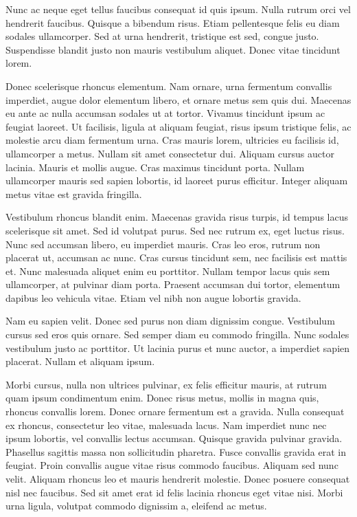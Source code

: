 Nunc ac neque eget tellus faucibus consequat id quis ipsum. Nulla rutrum orci vel hendrerit faucibus. Quisque a bibendum risus. Etiam pellentesque felis eu diam sodales ullamcorper. Sed at urna hendrerit, tristique est sed, congue justo. Suspendisse blandit justo non mauris vestibulum aliquet. Donec vitae tincidunt lorem.

Donec scelerisque rhoncus elementum. Nam ornare, urna fermentum convallis imperdiet, augue dolor elementum libero, et ornare metus sem quis dui. Maecenas eu ante ac nulla accumsan sodales ut at tortor. Vivamus tincidunt ipsum ac feugiat laoreet. Ut facilisis, ligula at aliquam feugiat, risus ipsum tristique felis, ac molestie arcu diam fermentum urna. Cras mauris lorem, ultricies eu facilisis id, ullamcorper a metus. Nullam sit amet consectetur dui. Aliquam cursus auctor lacinia. Mauris et mollis augue. Cras maximus tincidunt porta. Nullam ullamcorper mauris sed sapien lobortis, id laoreet purus efficitur. Integer aliquam metus vitae est gravida fringilla.

Vestibulum rhoncus blandit enim. Maecenas gravida risus turpis, id tempus lacus scelerisque sit amet. Sed id volutpat purus. Sed nec rutrum ex, eget luctus risus. Nunc sed accumsan libero, eu imperdiet mauris. Cras leo eros, rutrum non placerat ut, accumsan ac nunc. Cras cursus tincidunt sem, nec facilisis est mattis et. Nunc malesuada aliquet enim eu porttitor. Nullam tempor lacus quis sem ullamcorper, at pulvinar diam porta. Praesent accumsan dui tortor, elementum dapibus leo vehicula vitae. Etiam vel nibh non augue lobortis gravida.

Nam eu sapien velit. Donec sed purus non diam dignissim congue. Vestibulum cursus sed eros quis ornare. Sed semper diam eu commodo fringilla. Nunc sodales vestibulum justo ac porttitor. Ut lacinia purus et nunc auctor, a imperdiet sapien placerat. Nullam et aliquam ipsum.

Morbi cursus, nulla non ultrices pulvinar, ex felis efficitur mauris, at rutrum quam ipsum condimentum enim. Donec risus metus, mollis in magna quis, rhoncus convallis lorem. Donec ornare fermentum est a gravida. Nulla consequat ex rhoncus, consectetur leo vitae, malesuada lacus. Nam imperdiet nunc nec ipsum lobortis, vel convallis lectus accumsan. Quisque gravida pulvinar gravida. Phasellus sagittis massa non sollicitudin pharetra. Fusce convallis gravida erat in feugiat. Proin convallis augue vitae risus commodo faucibus. Aliquam sed nunc velit. Aliquam rhoncus leo et mauris hendrerit molestie. Donec posuere consequat nisl nec faucibus. Sed sit amet erat id felis lacinia rhoncus eget vitae nisi. Morbi urna ligula, volutpat commodo dignissim a, eleifend ac metus.

